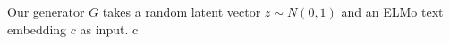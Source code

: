 Our generator $G$ takes a random latent vector $z \sim N(0, 1)$ and an ELMo text embedding $c$ as input. c